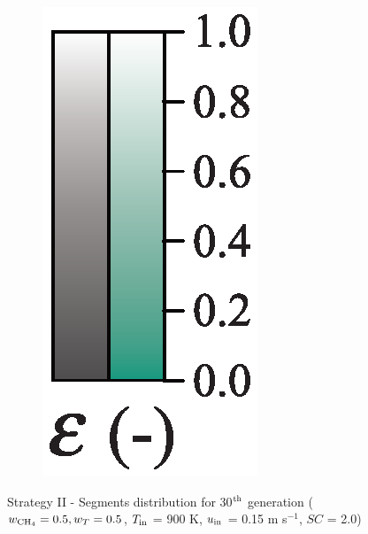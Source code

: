 \documentclass[preprint,12pt]{elsarticle}
\begin{document}
\begin{figure}
\begin{subfigure}[b]{0.1\textwidth}
     	\includegraphics[width=\textwidth]{segments_porosity.eps}
     \end{subfigure}
\caption{\label{fig:30L6040G1-TField} Strategy II - Segments distribution for 30$^{\rm{th}}$ generation ($w_{\rm{CH_4}} = 0.5, w_T = 0.5$, $T_{\rm{in}}$ = 900 K, $u_{\rm{in}}$ = 0.15 m s$^{-1}$, $SC$ = 2.0)}
\end{figure}
\end{document}
